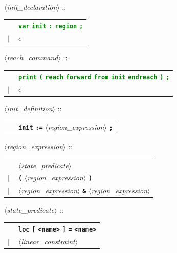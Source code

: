 \documentclass[a4paper,10pt]{article}
\newcommand{\emptystring}{$\epsilon$}
\newcommand{\nt}[1]{$\langle$\emph{#1}$\rangle$}
\newcommand{\regleGrammaire}[1]{\bigskip \noindent \nt{#1} :: \\}
\newcommand{\npec}[1]{\textcolor{green}{#1}}
\newcommand{\code}[1]{\textbf{\texttt{#1}}}
\begin{document}
\regleGrammaire{init\_declaration}
\begin{tabular}{l l}
	\  & \npec{\code{var} \code{init} \code{:} \code{region} \code{;}} \\
	$|$ & \emptystring \\
\end{tabular}

\regleGrammaire{reach\_command}
\begin{tabular}{l l}
	\  & \npec{\code{print} \code{(} \code{reach} \code{forward} \code{from} \code{init} \code{endreach} \code{)} \code{;}} \\
	$|$ & \emptystring \\
\end{tabular}

\regleGrammaire{init\_definition}
\begin{tabular}{l l}
	\  & \code{init} \code{:=} \nt{region\_expression} \code{;} \\
\end{tabular}

\regleGrammaire{region\_expression}
\begin{tabular}{l l}
	\  & \nt{state\_predicate} \\
	$|$ & \code{(} \nt{region\_expression} \code{)} \\
	$|$ & \nt{region\_expression} \code{\&} \nt{region\_expression} \\
\end{tabular}

\regleGrammaire{state\_predicate}
\begin{tabular}{l l}
	\  & \code{loc} \code{[} \code{<name>} \code{]} \code{=} \code{<name>} \\
	$|$ & \nt{linear\_constraint} \\
\end{tabular}



\end{document}
